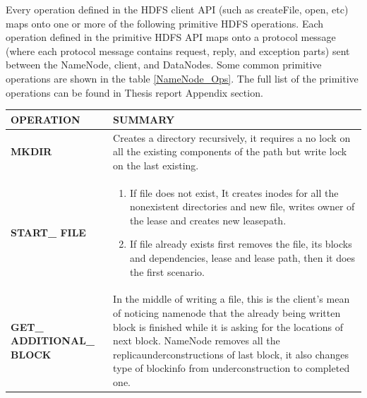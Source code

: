 Every   operation  defined  in  the  HDFS  client  API  (such  as   createFile,  open,  etc)  maps   onto  one  or  more  of  the  following  primitive  HDFS  operations.  Each  operation  defined  in  the primitive  HDFS  API  maps  onto a protocol message (where each protocol message contains request, reply, and exception  parts) sent between the NameNode, client, and DataNodes. Some  common   primitive  operations  are  shown   in   the  table \ref{NameNode_Ops}.  The  full  list  of  the primitive operations can be found in Thesis report \cite{12} Appendix section.
\begin{table}[t]
\centering
\begin{tabular}{|l|p{12cm}|}
\hline
\textbf{OPERATION} & \textbf{SUMMARY}\\
\hline
\textbf{MKDIR}&Creates   a  directory   recursively,  it  requires   a  no
lock   on  all  the  existing  components   of  the  path
but  write  lock   on  the  last existing.\\
\hline
\textbf{START\_ FILE} & \begin{enumerate}
\item If  file  does   not  exist,  It  creates   inodes
for  all  the  nonexistent  directories   and
new  file,  writes   owner  of  the  lease  and
creates new leasepath.
\item If  file  already   exists   first  removes   the
file,  its   blocks   and  dependencies,  lease
and  lease  path,  then  it  does   the  first
scenario.
\end{enumerate}\\
\hline
\textbf{GET\_ ADDITIONAL\_ BLOCK}&  In  the  middle  of  writing  a  file,  this   is   the  client’s
           mean  of  noticing  namenode  that  the  already
                 being  written  block   is   finished  while  it  is   asking
                        for  the  locations   of  next  block.  NameNode
                             removes   all  the  replicaunderconstructions   of
                                  last  block, it also changes  type of blockinfo from
                                          underconstruction  to  completed  one.\\


\end{tabular}
\end{table}
